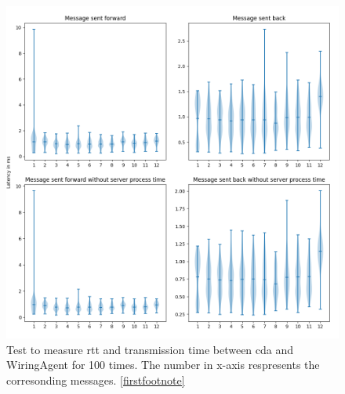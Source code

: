 \begin{figure}[htb]
    \includegraphics[width=\textwidth]{figures/appendix/usecase/violin_CoordinatorAgent_to_WiringAgent.png}
    \centering
    \caption{Test to measure \gls{rtt} and transmission time between \gls{cda} and 
    WiringAgent for 100 times. The number in x-axis respresents the 
    corresonding messages. \protect\ref{firstfootnote}}
    \label{fig: violin-CDA-WI}
\end{figure}


